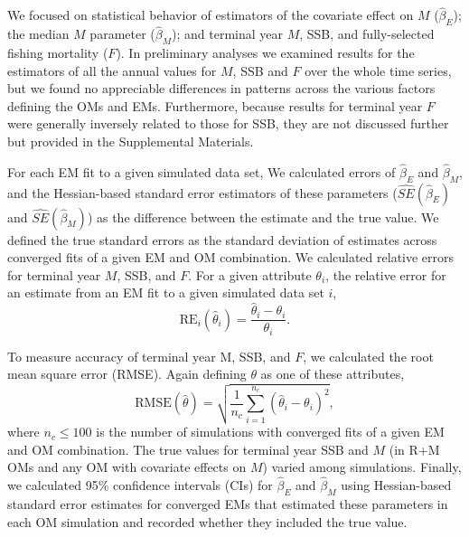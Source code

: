 \documentclass[
  12pt,
]{article}
\begin{document}
We focused on statistical behavior of estimators of the covariate effect
on \(M\) (\(\widehat \beta_E\)); the median \(M\) parameter
(\(\widehat \beta_M\)); and terminal year \(M\), SSB, and fully-selected
fishing mortality (\(F\)). In preliminary analyses we examined results
for the estimators of all the annual values for \(M\), SSB and \(F\)
over the whole time series, but we found no appreciable differences in
patterns across the various factors defining the OMs and EMs.
Furthermore, because results for terminal year \(F\) were generally
inversely related to those for SSB, they are not discussed further but
provided in the Supplemental Materials.

For each EM fit to a given simulated data set, We calculated errors of
\(\widehat \beta_E\) and \(\widehat \beta_M\), and the Hessian-based
standard error estimators of these parameters
(\(\widehat{SE}\left(\widehat \beta_E\right)\) and
\(\widehat{SE}\left(\widehat \beta_M\right)\)) as the difference between
the estimate and the true value. We defined the true standard errors as
the standard deviation of estimates across converged fits of a given EM
and OM combination. We calculated relative errors for terminal year
\(M\), SSB, and \(F\). For a given attribute \(\theta_i\), the relative
error for an estimate from an EM fit to a given simulated data set
\(i\), \begin{equation}\label{relerror}
\text{RE}_i\left(\widehat \theta_i\right) = \frac{\widehat \theta_i - \theta_i}{\theta_i}.
\end{equation}

To measure accuracy of terminal year M, SSB, and \(F\), we calculated
the root mean square error (RMSE). Again defining \(\theta\) as one of
these attributes, \[
\text{RMSE}\left(\widehat \theta\right) = \sqrt{\frac{1}{n_c}\sum^{n_c}_{i=1}\left(\widehat \theta_i - \theta_i\right)^2},
\] where \(n_c\leq 100\) is the number of simulations with converged
fits of a given EM and OM combination. The true values for terminal year
SSB and \(M\) (in R+M OMs and any OM with covariate effects on \(M\))
varied among simulations. Finally, we calculated 95\% confidence
intervals (CIs) for \(\widehat \beta_E\) and \(\widehat \beta_M\) using
Hessian-based standard error estimates for converged EMs that estimated
these parameters in each OM simulation and recorded whether they
included the true value.
\end{document}
